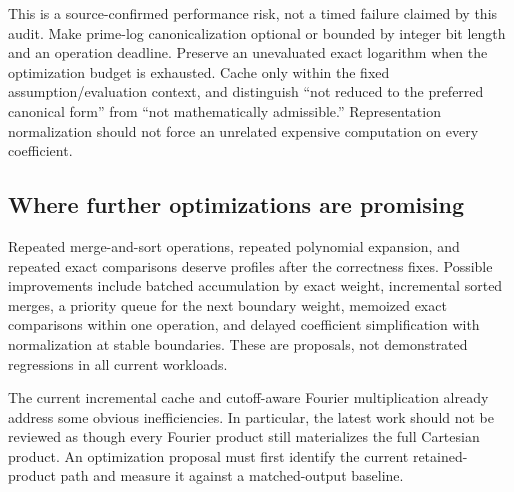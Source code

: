 \documentclass[11pt,a4paper]{article}
\begin{document}
This is a source-confirmed performance risk, not a timed failure claimed by this audit. Make prime-log canonicalization optional or bounded by integer bit length and an operation deadline. Preserve an unevaluated exact logarithm when the optimization budget is exhausted. Cache only within the fixed assumption/evaluation context, and distinguish ``not reduced to the preferred canonical form'' from ``not mathematically admissible.'' Representation normalization should not force an unrelated expensive computation on every coefficient.

\subsection{Where further optimizations are promising}
Repeated merge-and-sort operations, repeated polynomial expansion, and repeated exact comparisons deserve profiles after the correctness fixes. Possible improvements include batched accumulation by exact weight, incremental sorted merges, a priority queue for the next boundary weight, memoized exact comparisons within one operation, and delayed coefficient simplification with normalization at stable boundaries. These are proposals, not demonstrated regressions in all current workloads.

The current incremental cache and cutoff-aware Fourier multiplication already address some obvious inefficiencies. In particular, the latest work should not be reviewed as though every Fourier product still materializes the full Cartesian product. An optimization proposal must first identify the current retained-product path and measure it against a matched-output baseline.\cite{repo-incremental,repo-fourier,repo-validation}
\end{document}
